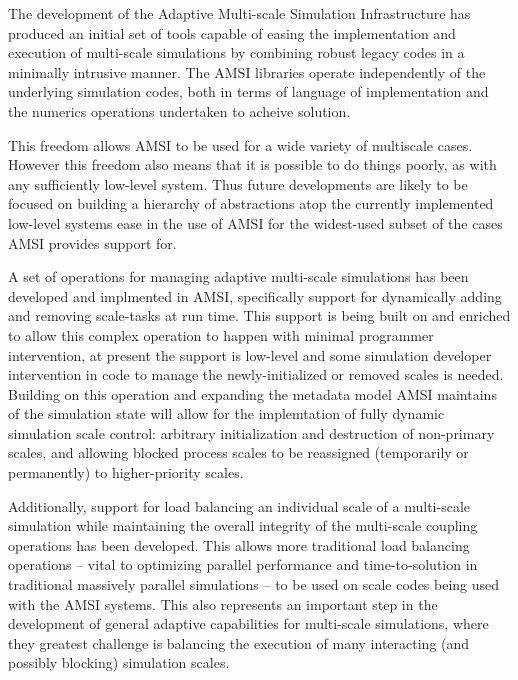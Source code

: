 \label{sumup}
The development of the Adaptive Multi-scale Simulation Infrastructure has produced an initial set of tools capable of easing the implementation and execution of multi-scale simulations by combining robust legacy codes in a minimally intrusive manner. The AMSI libraries operate independently of the underlying simulation codes, both in terms of language of implementation and the numerics operations undertaken to acheive solution.

This freedom allows AMSI to be used for a wide variety of multiscale cases. However this freedom also means that it is possible to do things poorly, as with any sufficiently low-level system. Thus future developments are likely to be focused on building a hierarchy of abstractions atop the currently implemented low-level systems ease in the use of AMSI for the widest-used subset of the cases AMSI provides support for.

A set of operations for managing adaptive multi-scale simulations has been developed and implmented in AMSI, specifically support for dynamically adding and removing scale-tasks at run time. This support is being built on and enriched to allow this complex operation to happen with minimal programmer intervention, at present the support is low-level and some simulation developer intervention in code to manage the newly-initialized or removed scales is needed. Building on this operation and expanding the metadata model AMSI maintains of the simulation state will allow for the implemtation of fully dynamic simulation scale control: arbitrary initialization and destruction of non-primary scales, and allowing blocked process scales to be reassigned (temporarily or permanently) to higher-priority scales.

Additionally, support for load balancing an individual scale of a multi-scale simulation while maintaining the overall integrity of the multi-scale coupling operations has been developed. This allows more traditional load balancing operations -- vital to optimizing parallel performance and time-to-solution in traditional massively parallel simulations -- to be used on scale codes being used with the AMSI systems. This also represents an important step in the development of general adaptive capabilities for multi-scale simulations, where they greatest challenge is balancing the execution of many interacting (and possibly blocking) simulation scales.
